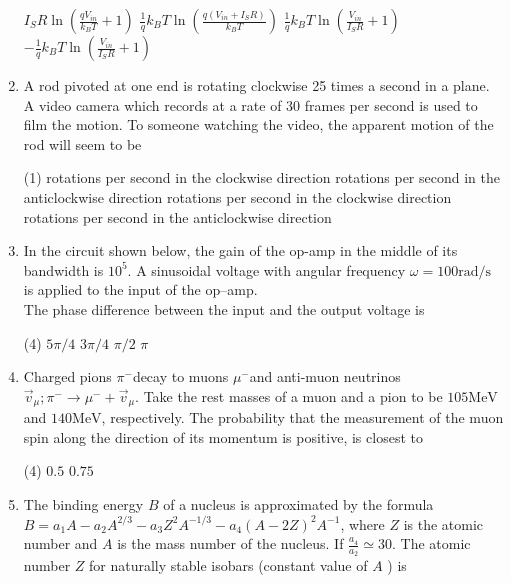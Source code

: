 \begin{enumerate}
\begin{tasks}
	\task[\textbf{a.}]$I_{S} R \ln \left(\frac{q V_{i n}}{k_{B} T}+1\right)$
	\task[\textbf{b.}]$\frac{1}{q} k_{B} T \ln \left(\frac{q\left(V_{i n}+I_{S} R\right)}{k_{B} T}\right)$
	\task[\textbf{c.}]$\frac{1}{q} k_{B} T \ln \left(\frac{V_{i n}}{I_{S} R}+1\right)$
	\task[\textbf{d.}] $-\frac{1}{q} k_{B} T \ln \left(\frac{V_{i n}}{I_{S} R}+1\right)$
\end{tasks}
\item A rod pivoted at one end is rotating clockwise 25 times a second in a plane. A video camera which records at a rate of 30 frames per second is used to film the motion. To someone watching the video, the apparent motion of the rod will seem to be
 \begin{tasks}(1)
	 rotations per second in the clockwise direction
	 rotations per second in the anticlockwise direction
	 rotations per second in the clockwise direction
	 rotations per second in the anticlockwise direction
\end{tasks}
\item  In the circuit shown below, the gain of the op-amp in the middle of its bandwidth is $10^{5}$. A sinusoidal voltage with angular frequency $\omega=100 \mathrm{rad} / \mathrm{s}$ is applied to the input of the op--amp.\\
The phase difference between the input and the output voltage is
 \begin{tasks}(4)
	\task[\textbf{a.}]$5 \pi / 4$
	\task[\textbf{b.}]$3 \pi / 4$
	\task[\textbf{c.}]$\pi / 2$
	\task[\textbf{d.}]$\pi$ 
\end{tasks}
\item Charged pions $\pi^{-}$decay to muons $\mu^{-}$and anti-muon neutrinos $\vec{v}_{\mu} ; \pi^{-} \rightarrow \mu^{-}+\vec{v}_{\mu}$. Take the rest masses of a muon and a pion to be $105 \mathrm{MeV}$ and $140 \mathrm{MeV}$, respectively. The probability that the measurement of the muon spin along the direction of its momentum is positive, is closest to
 \begin{tasks}(4)
	\task[\textbf{a.}]$0.5$
	\task[\textbf{b.}]$0.75$
\end{tasks}
\item  The binding energy $B$ of a nucleus is approximated by the formula $B=a_{1} A-a_{2} A^{2 / 3}-a_{3} Z^{2} A^{-1 / 3}-a_{4}(A-2 Z)^{2} A^{-1}$, where $Z$ is the atomic number and $A$ is the mass number of the nucleus. If $\frac{a_{4}}{a_{2}} \simeq 30$. The atomic number $Z$ for naturally stable isobars (constant value of $A$ ) is

\end{enumerate}
